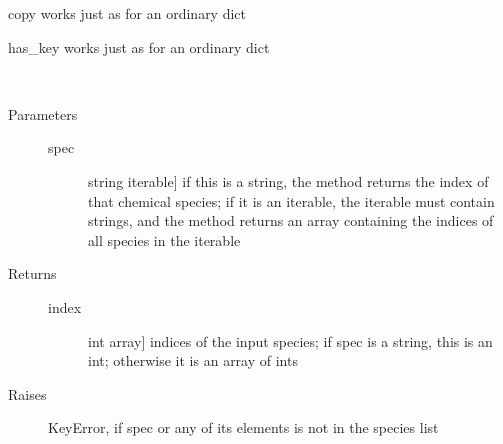 \documentclass[letterpaper,10pt,english]{sphinxmanual}
\begin{document}
\begin{fulllineitems}
\begin{fulllineitems}
\end{fulllineitems}


\begin{fulllineitems}
\label{fulldoc:despotic.chemistry.abundanceDict.copy}
copy works just as for an ordinary dict

\end{fulllineitems}


\begin{fulllineitems}
\label{fulldoc:despotic.chemistry.abundanceDict.has_key}
has\_key works just as for an ordinary dict

\end{fulllineitems}


\begin{fulllineitems}
\label{fulldoc:despotic.chemistry.abundanceDict.index}~\begin{description}
\item[{Parameters}] \leavevmode\begin{description}
\item[{spec}] \leavevmode{[}string \textbar{} iterable{]}
if this is a string, the method returns the index of
that chemical species; if it is an iterable, the
iterable must contain strings, and  the method
returns an array containing the indices of all species in
the iterable

\end{description}

\item[{Returns}] \leavevmode\begin{description}
\item[{index}] \leavevmode{[}int \textbar{} array{]}
indices of the input species; if spec is a string, this is
an int; otherwise it is an array of ints

\end{description}

\item[{Raises}] \leavevmode
KeyError, if spec or any of its elements is not in the species
list

\end{description}


\end{fulllineitems}
\end{fulllineitems}
\end{document}
